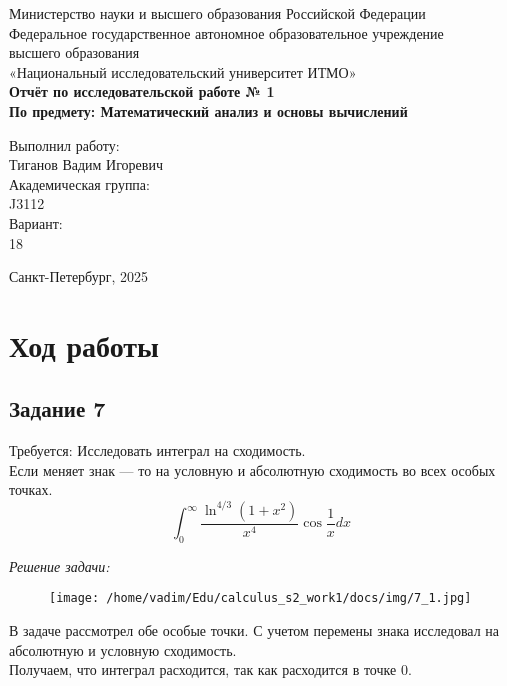 \documentclass[a4paper,12pt]{article}
\begin{document}
\thispagestyle{empty}
\begin{center}
    \large
    Министерство науки и высшего образования Российской Федерации\\
    Федеральное государственное автономное образовательное учреждение\\
    высшего образования\\
    «Национальный исследовательский университет ИТМО»\\
    \vspace{5cm}
    \textbf{Отчёт по исследовательской работе № 1}\\
    \textbf{По предмету: Математический анализ и основы вычислений}\\
    \vspace{6cm}
    \begin{flushright}
        Выполнил работу:\\ Тиганов Вадим Игоревич\\
        \vspace{1cm}
        Академическая группа: \\ J3112\\
        \vspace{1cm}
        Вариант: \\18
    \end{flushright}
    \vspace{1cm}
    \vspace{3cm}
    \begin{center}
        Санкт-Петербург, 2025\\
    \end{center}
\end{center}

\newpage


\section{Ход работы}


\subsection{Задание 7}

Требуется:
Исследовать интеграл на сходимость.\\
Если меняет знак --- то на условную и абсолютную сходимость во всех особых точках.
\[
\int_{0}^{\infty} \frac{\ln^{4/3}(1+x^2)}{x^4}\cos\frac{1}{x}dx
\]

\emph{Решение задачи:}

\begin{figure}[H]
    \centering
    \texttt{[image: /home/vadim/Edu/calculus\_s2\_work1/docs/img/7\_1.jpg]}
    \label{fig:integral}
\end{figure}


В задаче рассмотрел обе особые точки. С учетом перемены знака исследовал на абсолютную и условную сходимость.\\
Получаем, что интеграл расходится, так как расходится в точке $0$.
\end{document}
